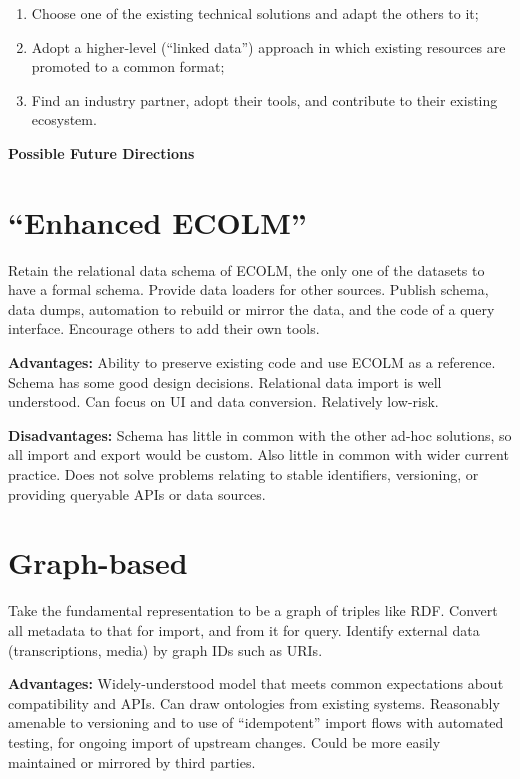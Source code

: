 \documentclass[a0,portrait]{a0poster}
\begin{document}
\begin{multicols}{3}
\begin{sloppypar}
  \begin{enumerate}
  \item Choose one of the existing technical solutions and adapt the
    others to it;
  \item Adopt a higher-level (``linked data'') approach in which
    existing resources are promoted to a common format;
  \item Find an industry partner, adopt their tools, and contribute to
    their existing ecosystem.
  \end{enumerate}
  

  \columnbreak

  \noindent\textbf{\LARGE Possible Future Directions}\\
  \vspace{-1cm}
  \section{``Enhanced ECOLM''}

  Retain the relational data schema of ECOLM, the only one of the
  datasets to have a formal schema. Provide data loaders for other
  sources. Publish schema, data dumps, automation to rebuild or mirror
  the data, and the code of a query interface. Encourage others to
  add their own tools.

  \noindent\textbf{Advantages:} Ability to preserve existing code and
  use ECOLM as a reference. Schema has some good design
  decisions. Relational data import is well understood. Can focus on
  UI and data conversion. Relatively low-risk.

  \noindent\textbf{Disadvantages:} Schema has little in common with
  the other ad-hoc solutions, so all import and export would be
  custom. Also little in common with wider current practice. Does not
  solve problems relating to stable identifiers, versioning, or
  providing queryable APIs or data sources.

  \section{Graph-based}

  Take the fundamental representation to be a graph of triples like
  RDF. Convert all metadata to that for import, and from it for
  query. Identify external data (transcriptions, media) by graph IDs
  such as URIs.

  \noindent\textbf{Advantages:} Widely-understood model that meets
  common expectations about compatibility and APIs. Can draw
  ontologies from existing systems. Reasonably amenable to versioning
  and to use of ``idempotent'' import flows with automated testing,
  for ongoing import of upstream changes. Could be more easily
  maintained or mirrored by third parties.


\end{sloppypar}
\end{multicols}
\end{document}

